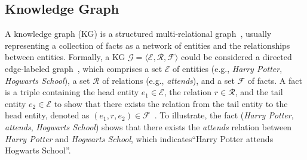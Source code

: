 






\subsection{Knowledge Graph}
\label{sec:pre_kg}

A knowledge graph (KG) is a structured multi-relational graph~\cite{bordes2013translating}, usually representing a collection of facts as a network of entities and the relationships between entities.
Formally, a KG \(\mathcal{G} = \langle \mathcal{E}, \mathcal{R}, \mathcal{F} \rangle\) could be considered a directed edge-labeled graph~\cite{ji2021survey}, which comprises a set \(\mathcal{E}\) of entities (e.g., \textit{Harry Potter}, \textit{Hogwarts School}), a set \(\mathcal{R}\) of relations (e.g., \textit{attends}), and a set $\mathcal{F}$ of facts. A fact is a triple containing the head entity \(e_1 \in \mathcal{E}\), the relation $r \in \mathcal{R}$, and the tail entity \(e_2 \in \mathcal{E}\) to show that there exists the relation from the tail entity to the head entity, denoted as \((e_1, r, e_2) \in \mathcal{F}\)~\cite{hogan2021knowledge}. To illustrate, the fact (\textit{Harry Potter}, \textit{attends}, \textit{Hogwarts School}) shows that there exists the \textit{attends} relation between \textit{Harry Potter} and \textit{Hogwarts School}, which indicates``Harry Potter attends Hogwarts School''.

